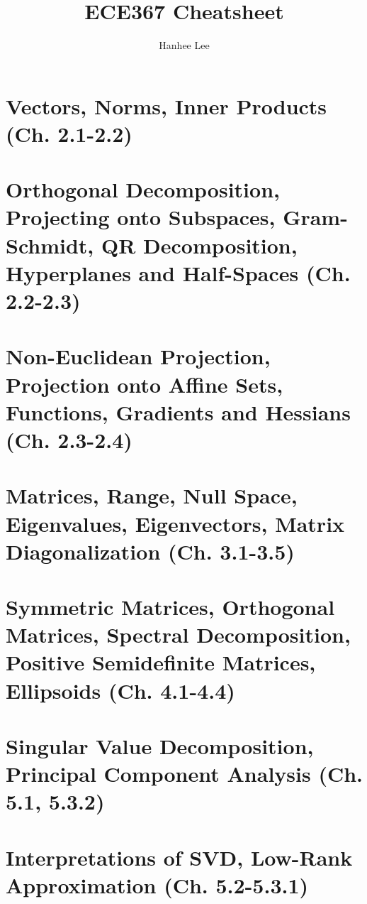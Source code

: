 \documentclass{article}
\title{ECE367 Cheatsheet}
\author{Hanhee Lee}
\begin{document}
\maketitle

\tableofcontents

\listoffigures

\listoftables

\section{Vectors, Norms, Inner Products (Ch. 2.1-2.2)}


\section{Orthogonal Decomposition, Projecting onto Subspaces, Gram-Schmidt, QR Decomposition, Hyperplanes and Half-Spaces (Ch. 2.2-2.3)}


\section{Non-Euclidean Projection, Projection onto Affine Sets, Functions, Gradients and Hessians (Ch. 2.3-2.4)}


\section{Matrices, Range, Null Space, Eigenvalues, Eigenvectors, Matrix Diagonalization (Ch. 3.1-3.5)}


\section{Symmetric Matrices, Orthogonal Matrices, Spectral Decomposition, Positive Semidefinite Matrices, Ellipsoids (Ch. 4.1-4.4)}


\section{Singular Value Decomposition, Principal Component Analysis (Ch. 5.1, 5.3.2)}


\section{Interpretations of SVD, Low-Rank Approximation (Ch. 5.2-5.3.1)}

\end{document}
